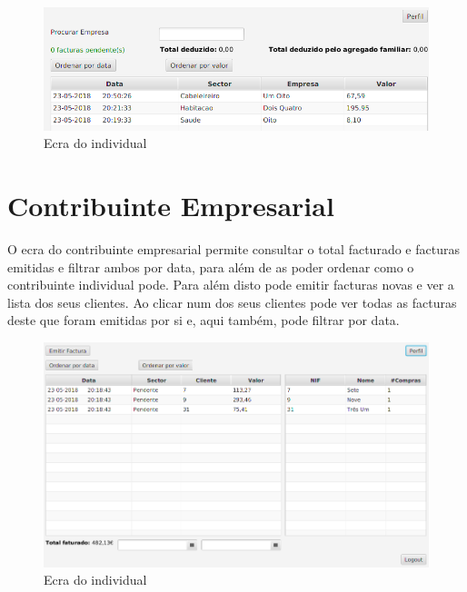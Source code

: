 \documentclass[12pt,a4paper]{report}
\begin{document}
\begin{figure}[h]
    \centering
    \includegraphics[width=\textwidth]{./images/IndividualScreen.png}
    \caption{Ecra do individual}
    \label{fig:individual}
\end{figure}

    \section{Contribuinte Empresarial}
    O ecra do contribuinte empresarial permite consultar o total facturado
    e facturas emitidas e filtrar ambos por data, para além de as poder ordenar
    como o contribuinte individual pode. Para além disto pode emitir facturas
    novas e ver a lista dos seus clientes. Ao clicar num dos seus clientes pode
    ver todas as facturas deste que foram emitidas por si e, aqui também, pode
    filtrar por data.

\begin{figure}[h]
    \centering
    \includegraphics[width=\textwidth]{./images/empresaScreen.png}
    \caption{Ecra do individual}
    \label{fig:individual}
\end{figure}
\end{document}
